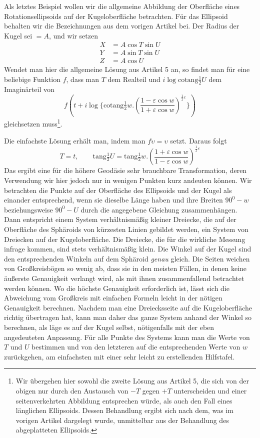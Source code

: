 Als letztes Beispiel wollen wir die allgemeine Abbildung der Oberfläche eines Rotationsellipsoids auf der Kugeloberfläche betrachten. Für das Ellipsoid behalten wir die Bezeichnungen aus dem vorigen Artikel bei. Der Radius der Kugel sei \(=A\), und wir setzen
\[
\begin{aligned}
X&=A\cos T\sin U\\
Y&=A\sin T\sin U\\
Z&=A\cos U
\end{aligned}
\]
%
\noindent Wendet man hier die allgemeine Lösung aus Artikel 5 an, so findet man für eine beliebige Funktion \(f\), dass man \(T\) dem Realteil und \(i\log\mathrm{cotang}\tfrac{1}{2}U\) dem Imaginärteil von
\[
f(t+i\log\{\mathrm{cotang}\tfrac{1}{2}w\mathord{.}(\frac{1-\varepsilon\cos w}{1+\varepsilon\cos w})^{\frac{1}{2}\varepsilon}\})
\]
\noindent gleichsetzen muss\footnote{Wir übergehen hier sowohl die zweite Lösung aus Artikel 5, die sich von der obigen nur durch den Austausch von \(-T\) gegen \(+T\) unterscheiden und einer seitenverkehrten Abbildung entsprechen würde, als auch den Fall eines länglichen Ellipsoids. Dessen Behandlung ergibt sich nach dem, was im vorigen Artikel dargelegt wurde, unmittelbar aus der Behandlung des abgeplatteten Ellipsoids.}.

Die einfachste Lösung erhält man, indem man \(f\upsilon=\upsilon\) setzt. Daraus folgt
\[
T=t,\qquad \mathrm{tang}\tfrac{1}{2}U=\mathrm{tang}\tfrac{1}{2}w\mathord{.}(\frac{1+\varepsilon\cos w}{1-\varepsilon\cos w})^{\frac{1}{2}\varepsilon}
\]
\noindent Das ergibt eine für die höhere Geodäsie sehr brauchbare Transformation, deren Verwendung wir hier jedoch nur in wenigen Punkten kurz andeuten können. Wir betrachten die Punkte auf der Oberfläche des Ellipsoids und der Kugel als einander entsprechend, wenn sie dieselbe Länge haben und ihre Breiten \(90^0-w\) beziehungsweise \(90^0-U\) durch die angegebene Gleichung zusammenhängen. Dann entspricht einem System verhältnismäßig kleiner Dreiecke, die auf der Oberfläche des Sphäroids von kürzesten Linien gebildet werden, ein System von Dreiecken auf der Kugeloberfläche. Die Dreiecke, die für die wirkliche Messung infrage kommen, sind stets verhältnismäßig klein. Die Winkel auf der Kugel sind den entsprechenden Winkeln auf dem Sphäroid \textit{genau} gleich. Die Seiten weichen von Großkreisbögen so wenig ab, dass sie in den meisten Fällen, in denen keine äußerste Genauigkeit verlangt wird, als mit ihnen zusammenfallend betrachtet werden können. Wo die höchste Genauigkeit erforderlich ist, lässt sich die Abweichung vom Großkreis mit einfachen Formeln leicht in der nötigen Genauigkeit berechnen. Nachdem man eine Dreiecksseite auf die Kugeloberfläche richtig übertragen hat, kann man daher das ganze System anhand der Winkel so berechnen, als läge es auf der Kugel selbst, nötigenfalls mit der eben angedeuteten Anpassung. Für alle Punkte des Systems kann man die Werte von \(T\) und \(U\) bestimmen und von den letzteren auf die entsprechenden Werte von \(w\) zurückgehen, am einfachsten mit einer sehr leicht zu erstellenden Hilfstafel.
